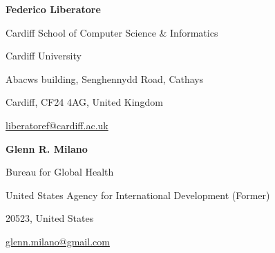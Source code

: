 \documentclass[
  11pt,
  authoryear,
  doubleblind,
  3p]{elsarticle}
\begin{document}
\noindent\begin{minipage}{\linewidth}
\textbf{Federico Liberatore}\par
Cardiff School of Computer Science \& Informatics\par
Cardiff University\par
Abacws building, Senghennydd Road, Cathays\par
Cardiff, CF24 4AG, United Kingdom\par
\href{mailto:liberatoref@cardiff.ac.uk}{liberatoref@cardiff.ac.uk}\par
\end{minipage}\par\vspace{1em}

\noindent\begin{minipage}{\linewidth}
\textbf{Glenn R. Milano}\par
Bureau for Global Health\par
United States Agency for International Development (Former)\par
20523, United States\par
\href{mailto:glenn.milano@gmail.com}{glenn.milano@gmail.com}\par
\end{minipage}\par
\endgroup
\clearpage

\let\pomOriginalMaketitleBox\MaketitleBox
\renewcommand{\MaketitleBox}{%
  \resetTitleCounters
  \begingroup
    \def\baselinestretch{1}%
    \setlength{\parskip}{0pt}%
    \ifvoid\absbox\else\unvbox\absbox\par\vskip10pt\fi
    \ifvoid\keybox\else\unvbox\keybox\par\fi
  \endgroup
}
\end{document}

